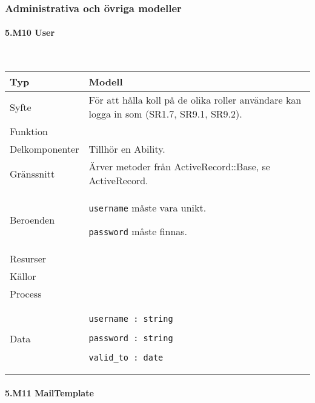 \documentclass[a4paper, twoside, 11pt, titlepage]{article}
\begin{document}
		\subsubsection{Administrativa och övriga modeller}



			\paragraph{5.M10 User}\

			\begin {table} [ht] \begin{tabular} {  p{3.5cm} p{9.6cm} }
				\hline
				{Typ} & {Modell} \\
				\hline
				{Syfte} & {För att hålla koll på de olika roller användare kan logga in som (SR1.7, SR9.1, SR9.2).} \\
				\hline
				{Funktion} & { } \\
				\hline
				{Delkomponenter} & {Tillhör en Ability.} \\
				\hline
				{Gränssnitt} & {Ärver metoder från ActiveRecord::Base, se ActiveRecord.} \\
				\hline
				{Beroenden} & {{\tt username} måste vara unikt.

{\tt password} måste finnas.} \\
				\hline
				{Resurser} & { } \\
				\hline
				{Källor} & { } \\
				\hline
				{Process} & { } \\
				\hline
				{Data} & {{\tt username : string}

{\tt password : string}

{\tt valid\_to : date}} \\
				\hline
			\end{tabular} \end{table} \FloatBarrier


			\paragraph{5.M11 MailTemplate}\
\end{document}
